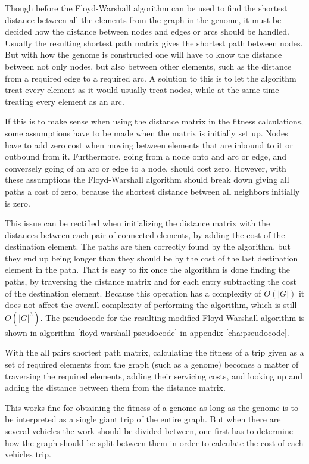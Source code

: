 Though before the Floyd-Warshall algorithm can be used to find the shortest distance between all the elements from the graph in the genome, it must be decided how the distance between nodes and edges or arcs should be handled. Usually the resulting shortest path matrix gives the shortest path between nodes. But with how the genome is constructed one will have to know the distance between not only nodes, but also between other elements, such as the distance from a required edge to a required arc. A solution to this is to let the algorithm treat every element as it would usually treat nodes, while at the same time treating every element as an arc.

If this is to make sense when using the distance matrix in the fitness calculations, some assumptions have to be made when the matrix is initially set up. Nodes have to add zero cost when moving between elements that are inbound to it or outbound from it. Furthermore, going from a node onto and arc or edge, and conversely going of an arc or edge to a node, should cost zero. However, with these assumptions the Floyd-Warshall algorithm should break down giving all paths a cost of zero, because the shortest distance between all neighbors initially is zero.

This issue can be rectified when initializing the distance matrix with the distances between each pair of connected elements, by adding the cost of the destination element. The paths are then correctly found by the algorithm, but they end up being longer than they should be by the cost of the last destination element in the path. That is easy to fix once the algorithm is done finding the paths, by traversing the distance matrix and for each entry subtracting the cost of the destination element. Because this operation has a complexity of $O(|G|)$ it does not affect the overall complexity of performing the algorithm, which is still $O(|G|^3)$. The pseudocode for the resulting modified Floyd-Warshall algorithm is shown in algorithm \ref{floyd-warshall-pseudocode} in appendix \ref{cha:pseudocode}.



With the all pairs shortest path matrix, calculating the fitness of a trip given as a set of required elements from the graph (such as a genome) becomes a matter of traversing the required elements, adding their servicing costs, and looking up and adding the distance between them from the distance matrix.

This works fine for obtaining the fitness of a genome as long as the genome is to be interpreted as a single giant trip of the entire graph. But when there are several vehicles the work should be divided between, one first has to determine how the graph should be split between them in order to calculate the cost of each vehicles trip.

